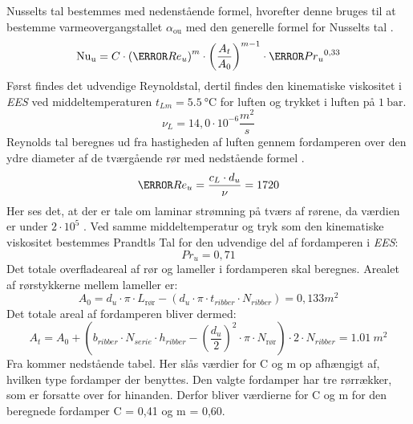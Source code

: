 \documentclass[../Hovedrapport.tex]{subfiles}
\begin{document}
Nusselts tal bestemmes med nedenstående formel, hvorefter denne bruges til at bestemme varmeovergangstallet $\alpha_\text{ou}$ med den generelle formel for Nusselts tal \citep{Noter_Aage}. 
\begin{equation}
    \si{Nu_u}  = C \cdot   \left( \V{Re} _{u} \right) ^{m} \cdot   \left(\frac{A_{t}}{A_{0}} \right) ^{m-1}    \cdot  \V{{Pr} _{u}}^{0,33}
\end{equation}
Først findes det udvendige Reynoldstal, dertil findes den kinematiske viskositet i \textit{EES} ved middeltemperaturen $t_{Lm} = \SI{5,5}{\celsius}$ for luften og trykket i luften på $\SI{1}{\bar}$.
\begin{equation}
\si{\nu_L} = 14,0\cdot 10^{-6}\si{\frac{m^2}{s}}
\end{equation}
Reynolds tal beregnes ud fra hastigheden af luften gennem fordamperen over den ydre diameter af de tværgående rør med nedstående formel \citep{termo}.
\begin{equation}
\V{Re} _{u} =\frac{c_{L} \cdot  d_{u}}{\si{\nu}} = 1720
\end{equation}
Her ses det, at der er tale om laminar strømning på tværs af rørene, da værdien er under $ 2 \cdot 10^{5} $ \citep{termo}. Ved samme middeltemperatur og tryk som den kinematiske viskositet bestemmes Prandtls Tal for den udvendige del af fordamperen i \textit{EES}:
\begin{equation}
Pr_{u} = 0,71		 
\end{equation}
Det totale overfladeareal af rør og lameller i fordamperen skal beregnes. Arealet af rørstykkerne mellem lameller er:
\begin{equation}
A_{0} = d_{u} \cdot  \pi \cdot  L_{\text{rør}} -  \left( d_{u} \cdot  \pi \cdot  t _{ribber} \cdot  N_{ribber} \right) = \si{0,133}{m^2}	 
\label{eq: Areal af rørstykker mellem ribber}
\end{equation}
Det totale areal af fordamperen bliver dermed:
\begin{equation}
A_{t} = A_{0} +  \left( b_{ribber}\cdot N_{serie}\cdot h_{ribber} -  \left(\frac{d_{u}}{2}\right) ^{2}\cdot \pi\cdot N_{\text{rør}} \right) \cdot 2\cdot N_{ribber	} = \SI{1,01}{m^2}	
\label{eq: Total overfladeareal fordamper}
\end{equation}
Fra \citep{Grundlagen_der_Wärmeübertragung} kommer nedstående tabel. Her slås værdier for C og m op afhængigt af, hvilken type fordamper der benyttes. Den valgte fordamper har tre rørrækker, som er forsatte over for hinanden. Derfor bliver værdierne for C og m for den beregnede fordamper C = 0,41 og m = 0,60.
\end{document}
